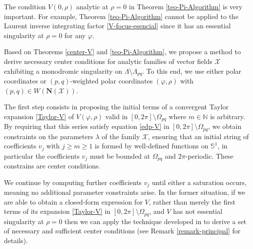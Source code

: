 \documentclass[12pt]{amsart}
\begin{document}
The condition $V(0, \rho)$ analytic at $\rho=0$ in Theorem \ref{teo-Pi-Algorithm} is very important. For example, Theorem \ref{teo-Pi-Algorithm} cannot be applied to the Laurent inverse integrating factor \eqref{V-focus-esencial} since it has an essential singularity at $\rho=0$ for any $\varphi$.


Based on Theorems \ref{center-V} and \ref{teo-Pi-Algorithm}, we propose a method to derive necessary center conditions for analytic families of vector fields $\mathcal{X}$ exhibiting a monodromic singularity on $\Lambda \setminus \Lambda_{pq}$. To this end, we use either polar coordinates or $(p,q)$-weighted polar coordinates $(\varphi, \rho)$ with $(p,q) \in W(\mathbf{N}(\mathcal{X}))$.

The first step consists in proposing the initial terms of a convergent Taylor expansion \eqref{Taylor-V} of $V(\varphi, \rho)$ valid in $[0, 2\pi] \setminus \Omega_{pq}$ where $m \in \mathbb{N}$ is arbitrary. By requiring that this series satisfy equation \eqref{edp-V} in $[0, 2\pi] \setminus \Omega_{pq}$, we obtain constraints on the parameters $\lambda$ of the family $\mathcal{X}$, ensuring that an initial string of coefficients $v_j$ with $j \geq m \geq 1$ is formed by well-defined functions on $\mathbb{S}^1$, in particular the coefficients $v_j$ must be bounded at $\Omega_{pq}$ and $2 \pi$-periodic. These constrains are center conditions.

We continue by computing further coefficients $v_j$ until either a saturation occurs, meaning no additional parameter constraints arise. In the former situation, if we are able to obtain a closed-form expression for $V$, rather than merely the first terms of its expansion \eqref{Taylor-V} in $[0, 2\pi] \setminus \Omega_{pq}$, and $V$ has not essential singularity at $\rho=0$ then we can apply the technique developed in \cite{GaGi4} to derive a set of necessary and sufficient center conditions (see Remark \ref{remark-principal} for details).
\end{document}
